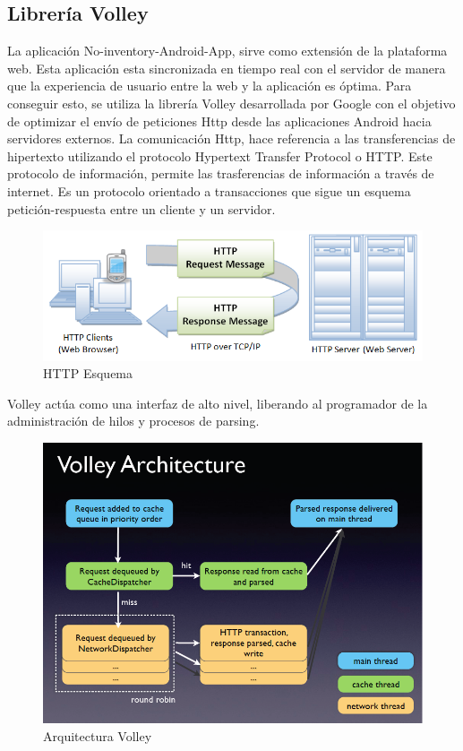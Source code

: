 \documentclass[a4paper,11pt]{book}
\begin{document}
\subsection{Librería Volley}
La aplicación No-inventory-Android-App, sirve como extensión de la plataforma web. Esta aplicación esta sincronizada en tiempo real con el servidor de manera que la experiencia de usuario entre la web y la aplicación es óptima.  Para conseguir esto, se utiliza la librería Volley\cite{volley} desarrollada por Google con el objetivo de optimizar el envío de peticiones Http desde las aplicaciones Android hacia servidores externos. La comunicación Http, hace referencia a las transferencias de hipertexto utilizando el protocolo Hypertext Transfer Protocol o HTTP\cite{http}. Este protocolo de información, permite las trasferencias de información a través de internet. Es un protocolo orientado a transacciones que sigue un esquema petición-respuesta entre un cliente y un servidor. 

\begin{figure}[H] 
\centering 
\includegraphics[scale=0.75]{imagenes/desarrollo_herramienta/HTTP.png}
\caption{ HTTP Esquema\cite{httpD}}
\end{figure}

Volley actúa como una interfaz de alto nivel, liberando al programador de la administración de hilos y procesos de parsing. 


\begin{figure}[H] 
\centering 
\includegraphics[scale=0.5]{imagenes/desarrollo_herramienta/volley.png}
\caption{ Arquitectura Volley\cite{volley2}}
\end{figure}
\end{document}
